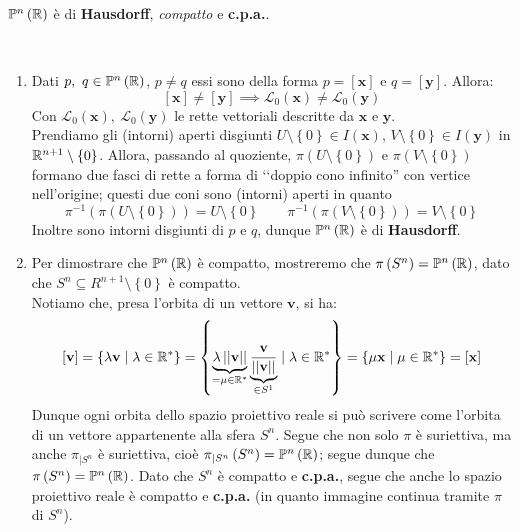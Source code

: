 \begin{proposition}
$\proj[n]{\realset}$ è di \textbf{Hausdorff}, \textit{compatto} e \textbf{c.p.a.}.
\end{proposition}
\begin{demonstration}~{}
\begin{enumerate}[label=\Roman*]
\item Dati $p,\ q\in\proj[n]{\realset}$, $p\neq q$ essi sono della forma $p=\left[\mathbf{x}\right]$ e $q=\left[\mathbf{y}\right]$. Allora:
\begin{equation*}
\left[\mathbf{x}\right]\neq\left[\mathbf{y}\right]\implies\mathcal{L}_0\left(\mathbf{x}\right)\neq\mathcal{L}_0\left(\mathbf{y}\right)
\end{equation*}
Con $\mathcal{L}_0\left(\mathbf{x}\right),\ \mathcal{L}_0\left(\mathbf{y}\right)$ le rette vettoriali descritte da $\mathbf{x}$ e $\mathbf{y}$.\\
Prendiamo gli (intorni) aperti disgiunti $U\setminus\left\{0\right\}\in I\left(\mathbf{x}\right)$, $V\setminus\left\{0\right\}\in I\left(\mathbf{y}\right)$ in $\mathbb{R}^{n+1}\setminus\left\{0\right\}$. Allora, passando al quoziente, $\pi\left(U\setminus\left\{0\right\}\right)$ e $\pi\left(V\setminus\left\{0\right\}\right)$ formano due fasci di rette a forma di ‘‘doppio cono infinito'' con vertice nell'origine; questi due coni sono (intorni) aperti in quanto
\begin{equation*}
\pi^{-1}\left(\pi\left(U\setminus\left\{0\right\}\right)\right)=U\setminus\left\{0\right\}\qquad\pi^{-1}\left(\pi\left(V\setminus\left\{0\right\}\right)\right)=V\setminus\left\{0\right\}
\end{equation*}
Inoltre sono intorni disgiunti di $p$ e $q$, dunque $\proj[n]{\realset}$ è di \textbf{Hausdorff}.
\item Per dimostrare che $\proj[n]{\realset}$ è compatto, mostreremo che $\pi\left(S^n\right)=\proj[n]{\realset}$, dato che $S^n\subseteq R^{n+1}\setminus\left\{0\right\}$ è compatto.\\
Notiamo che, presa l'orbita di un vettore $\mathbf{v}$, si ha:
\begin{equation*}
\left[\mathbf{v}\right]=\left\{\lambda \mathbf{v}\mid \lambda\in \mathbb{R}^{\ast}\right\}=\left\{\underbrace{\lambda \left|\left|\mathbf{v}\right|\right|}_{=\mu\in \mathbb{R}^{\ast}}\underbrace{\frac{\mathbf{v}}{\left|\left|\mathbf{v}\right|\right|}}_{\in S^1}\mid \lambda\in \mathbb{R}^{\ast}\right\}=\left\{\mu \mathbf{x}\mid \mu\in \mathbb{R}^{\ast}\right\}=\left[\mathbf{x}\right]
\end{equation*}
Dunque ogni orbita dello spazio proiettivo reale si può scrivere come l'orbita di un vettore appartenente alla sfera $S^n$. Segue che non solo $\pi$ è suriettiva, ma anche $\pi_{\mid S^n}$ è suriettiva, cioè $\pi_{\mid S^n}\left(S^n\right)=\proj[n]{\realset}$; segue dunque che $\pi\left(S^n\right)=\proj[n]{\realset}$. Dato che $S^n$ è compatto e \textbf{c.p.a.}, segue che anche lo spazio proiettivo reale è compatto e \textbf{c.p.a.} (in quanto immagine continua tramite $\pi$ di $S^n$).
\end{enumerate}
\vspace{-3mm}
\end{demonstration}